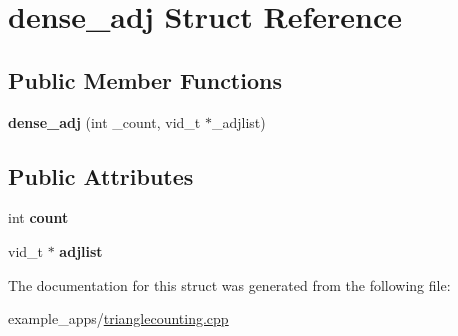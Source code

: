 \hypertarget{structdense__adj}{\section{dense\-\_\-adj Struct Reference}
\label{structdense__adj}
}
\subsection*{Public Member Functions}
\begin{DoxyCompactItemize}
\item 
\hypertarget{structdense__adj_ae927c505a018234181040d8f8047c239}{{\bfseries dense\-\_\-adj} (int \-\_\-count, vid\-\_\-t $\ast$\-\_\-adjlist)}\label{structdense__adj_ae927c505a018234181040d8f8047c239}

\end{DoxyCompactItemize}
\subsection*{Public Attributes}
\begin{DoxyCompactItemize}
\item 
\hypertarget{structdense__adj_a1516a6e0a96ca3b0bafc1a190a873815}{int {\bfseries count}}\label{structdense__adj_a1516a6e0a96ca3b0bafc1a190a873815}

\item 
\hypertarget{structdense__adj_a9e42d3e6d58a657806910cc1a6101d79}{vid\-\_\-t $\ast$ {\bfseries adjlist}}\label{structdense__adj_a9e42d3e6d58a657806910cc1a6101d79}

\end{DoxyCompactItemize}


The documentation for this struct was generated from the following file\-:\begin{DoxyCompactItemize}
\item 
example\-\_\-apps/\hyperlink{trianglecounting_8cpp}{trianglecounting.\-cpp}\end{DoxyCompactItemize}
